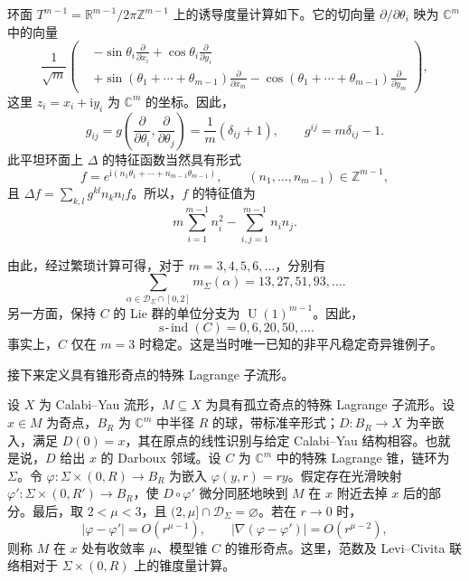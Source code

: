 环面 $T^{m-1}=\mathbb R^{m-1}/2\pi\mathbb Z^{m-1}$ 上的诱导度量计算如下。它的切向量 $\partial/\partial\theta_i$ 映为 $\mathbb C^m$ 中的向量
\[
\frac1{\sqrt m}\left(
\begin{aligned}
&-\sin\theta_i\frac\partial{\partial x_i}
+\cos\theta_i\frac\partial{\partial y_i}\\
&+\sin(\theta_1+\cdots+\theta_{m-1})\frac\partial{\partial x_m}
-\cos(\theta_1+\cdots+\theta_{m-1})\frac\partial{\partial y_m}
\end{aligned}\right),
\]
这里 $z_i=x_i+\mathrm i y_i$ 为 $\mathbb C^m$ 的坐标。因此，
\[
g_{ij}=g\left(\frac\partial{\partial\theta_i},
\frac\partial{\partial\theta_j}\right)=\frac1m(\delta_{ij}+1),
\qquad g^{ij}=m\delta_{ij}-1.
\]
此平坦环面上 $\Delta$ 的特征函数当然具有形式
\[
f=e^{\mathrm i(n_1\theta_1+\cdots+n_{m-1}\theta_{m-1})},
\qquad(n_1,\ldots,n_{m-1})\in\mathbb Z^{m-1},
\]
且 $\Delta f=\sum_{k,l}g^{kl}n_kn_lf$。所以，$f$ 的特征值为
\[
m\sum_{i=1}^{m-1}n_i^2-\sum_{i,j=1}^{m-1}n_in_j.
\]

由此，经过繁琐计算可得，对于 $m=3,4,5,6,\ldots$，分别有
\[
\sum_{\alpha\in\mathcal D_\Sigma\cap[0,2]}m_\Sigma(\alpha)
=13,27,51,93,\ldots.
\]
另一方面，保持 $C$ 的 Lie 群的单位分支为 $\operatorname U(1)^{m-1}$。因此，
\[
\operatorname{s\!\text{-}\!ind}(C)=0,6,20,50,\ldots.
\]
事实上，$C$ 仅在 $m=3$ 时稳定。这是当时唯一已知的非平凡稳定奇异锥例子。

接下来定义具有锥形奇点的特殊 Lagrange 子流形。
\begin{definition*}\label{def:7.conical-singularity}
设 $X$ 为 Calabi--Yau 流形，$M\subseteq X$ 为具有孤立奇点的特殊 Lagrange 子流形。设 $x\in M$ 为奇点，$B_R$ 为 $\mathbb C^m$ 中半径 $R$ 的球，带标准辛形式；$D\colon B_R\to X$ 为辛嵌入，满足 $D(0)=x$，其在原点的线性识别与给定 Calabi--Yau 结构相容。也就是说，$D$ 给出 $x$ 的 Darboux 邻域。设 $C$ 为 $\mathbb C^m$ 中的特殊 Lagrange 锥，链环为 $\Sigma$。令 $\varphi\colon\Sigma\times(0,R)\to B_R$ 为嵌入 $\varphi(y,r)=ry$。假定存在光滑映射 $\varphi'\colon\Sigma\times(0,R')\to B_R$，使 $D\circ\varphi'$ 微分同胚地映到 $M$ 在 $x$ 附近去掉 $x$ 后的部分。最后，取 $2<\mu<3$，且 $(2,\mu]\cap\mathcal D_\Sigma=\varnothing$。若在 $r\to0$ 时，
\[
|\varphi-\varphi'|=O(r^{\mu-1}),\qquad
|\nabla(\varphi-\varphi')|=O(r^{\mu-2}),
\]
则称 $M$ 在 $x$ 处有收敛率 $\mu$、模型锥 $C$ 的锥形奇点。这里，范数及 Levi--Civita 联络相对于 $\Sigma\times(0,R)$ 上的锥度量计算。
\end{definition*}

